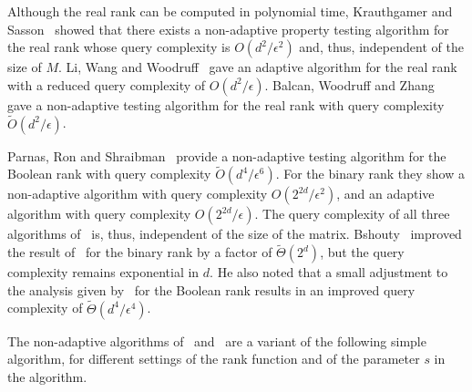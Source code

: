 \documentclass[11pt]{article}
\newtheorem{algorithm}[theorem]{Algorithm}
\begin{document}
{{Although the real rank can be computed in polynomial time, Krauthgamer and Sasson~\cite{krauthgamer2003property} showed
that there exists a non-adaptive property testing algorithm for the real rank whose query complexity is  $O(d^2 / \epsilon^2)$ and, thus, independent of the size of  $M$.
Li, Wang and Woodruff~\cite{Li} gave an adaptive algorithm for the real rank with a reduced query complexity of $O(d^2 / \epsilon)$.
Balcan, Woodruff and Zhang~\cite{BLWZ} gave a non-adaptive testing algorithm for the real rank with query complexity $\tilde{O}(d^2 / \epsilon)$.

Parnas, Ron and Shraibman~\cite{parnas2021property} provide a non-adaptive testing algorithm for the Boolean rank with query complexity $\tilde{O}(d^4/\epsilon^6)$.
For the binary rank they show a non-adaptive algorithm with query complexity $O(2^{2d} /\epsilon^2)$,  and an adaptive algorithm with query complexity $O(2^{2d} /\epsilon)$.
The query complexity of all three algorithms of~\cite{parnas2021property} is, thus, independent of the size of the matrix.
Bshouty~\cite{bshouty2023property} improved the result of~\cite{parnas2021property} for the binary rank by a factor of $\tilde{\Theta}(2^{d})$,
but the query complexity remains exponential in $d$. He also noted that a small adjustment to the analysis given by~\cite{parnas2021property}
for the Boolean rank results in an improved query complexity of $\tilde{\Theta}\left(d^4/ \epsilon^4\right)$.

The non-adaptive algorithms of~\cite{krauthgamer2003property} and~\cite{parnas2021property}
are a variant of the following simple algorithm, for different settings of the rank function and of the parameter $s$ in the algorithm.


\bigskip
\begin{center}
\end{center}
\bigskip

}}
\end{document}
